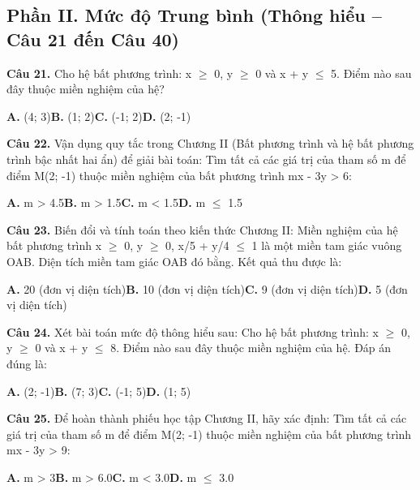 \documentclass[11pt,a4paper]{article}
\begin{document}
\subsection*{\color{accent} Phần II. Mức độ Trung bình (Thông hiểu -- Câu 21 đến Câu 40)}
\textbf{\color{primary} Câu 21.} Cho hệ bất phương trình: x $\ge$ 0, y $\ge$ 0 và x + y $\le$ 5. Điểm nào sau đây thuộc miền nghiệm của hệ?\par
\hspace*{1.5em}\textbf{A.} (4; 3)\quad\quad \textbf{B.} (1; 2)\quad\quad \textbf{C.} (-1; 2)\quad\quad \textbf{D.} (2; -1)\par\vspace{2pt}
\textbf{\color{primary} Câu 22.} Vận dụng quy tắc trong Chương II (Bất phương trình và hệ bất phương trình bậc nhất hai ẩn) để giải bài toán: Tìm tất cả các giá trị của tham số m để điểm M(2; -1) thuộc miền nghiệm của bất phương trình mx - 3y > 6:\par
\hspace*{1.5em}\textbf{A.} m > 4.5\quad\quad \textbf{B.} m > 1.5\quad\quad \textbf{C.} m < 1.5\quad\quad \textbf{D.} m $\le$ 1.5\par\vspace{2pt}
\textbf{\color{primary} Câu 23.} Biến đổi và tính toán theo kiến thức Chương II: Miền nghiệm của hệ bất phương trình x $\ge$ 0, y $\ge$ 0, x/5 + y/4 $\le$ 1 là một miền tam giác vuông OAB. Diện tích miền tam giác OAB đó bằng. Kết quả thu được là:\par
\hspace*{1.5em}\textbf{A.} 20 (đơn vị diện tích)\quad\quad \textbf{B.} 10 (đơn vị diện tích)\quad\quad \textbf{C.} 9 (đơn vị diện tích)\quad\quad \textbf{D.} 5 (đơn vị diện tích)\par\vspace{2pt}
\textbf{\color{primary} Câu 24.} Xét bài toán mức độ thông hiểu sau: Cho hệ bất phương trình: x $\ge$ 0, y $\ge$ 0 và x + y $\le$ 8. Điểm nào sau đây thuộc miền nghiệm của hệ. Đáp án đúng là:\par
\hspace*{1.5em}\textbf{A.} (2; -1)\quad\quad \textbf{B.} (7; 3)\quad\quad \textbf{C.} (-1; 5)\quad\quad \textbf{D.} (1; 5)\par\vspace{2pt}
\textbf{\color{primary} Câu 25.} Để hoàn thành phiếu học tập Chương II, hãy xác định: Tìm tất cả các giá trị của tham số m để điểm M(2; -1) thuộc miền nghiệm của bất phương trình mx - 3y > 9:\par
\hspace*{1.5em}\textbf{A.} m > 3\quad\quad \textbf{B.} m > 6.0\quad\quad \textbf{C.} m < 3.0\quad\quad \textbf{D.} m $\le$ 3.0\par\vspace{2pt}
\end{document}
